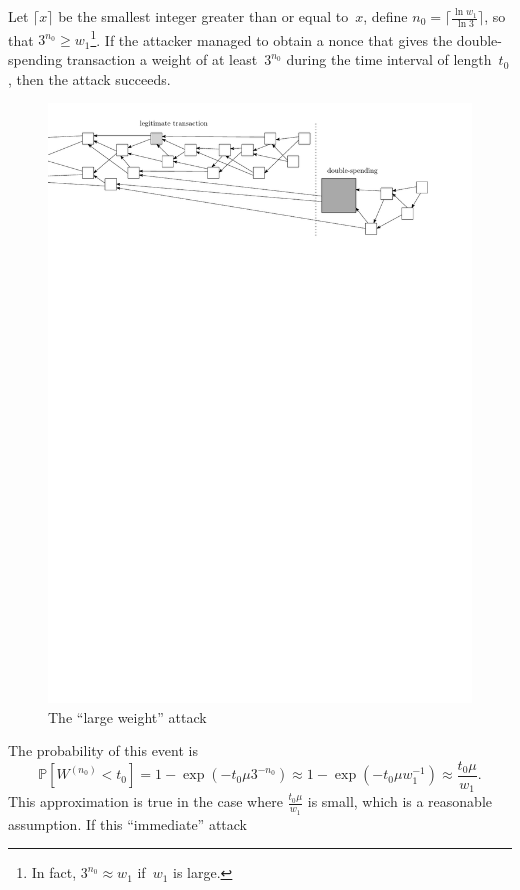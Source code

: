 \documentclass[12pt]{article}
\newcommand{\IP}{\mathbb{P}}
\begin{document}
Let $\lceil x\rceil$ be the smallest integer greater than
or equal to~$x$,
define $n_0=\big\lceil \frac{\ln w_1}{\ln 3}\big\rceil$, 
so that $3^{n_0}\geq w_1$\footnote{In fact, $3^{n_0}\approx w_1$
if~$w_1$ is large.}. If the attacker managed to obtain a nonce
that gives the double-spending transaction a weight of at least~$3^{n_0}$ during the time interval
of length~$t_0$,
 then the attack 
succeeds. 
\begin{figure}
 \centering \includegraphics[width=\textwidth]{bigPoW} 
\caption{The ``large weight'' attack}
\label{f_bigPoW}
\end{figure}
The probability of this event is
\[
 \IP[W^{(n_0)}<t_0]=1-\exp(-t_0\mu 3^{-n_0})
  \approx 1-\exp(-t_0\mu w_1^{-1})
  \approx \frac{t_0\mu}{w_1}.
\]
This approximation is true in the case where 
$\frac{t_0\mu}{w_1}$ is small, which is 
a reasonable assumption. If this ``immediate'' attack
\end{document}
